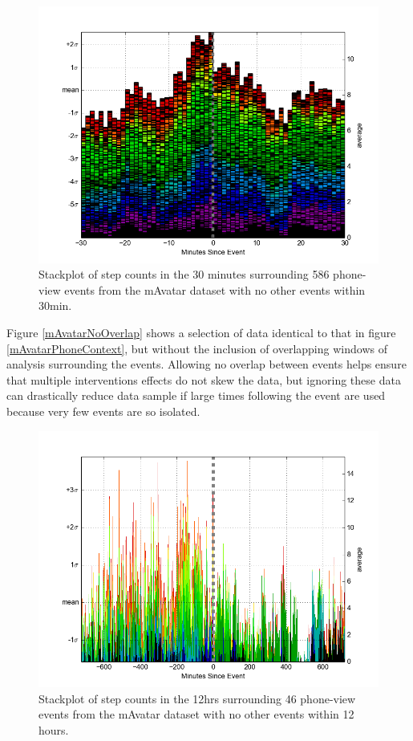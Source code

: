 \begin{figure}
\centering
\includegraphics[width=0.9\columnwidth]{./img/mAvatarViews_586_noOverlap.png}
\caption{Stackplot of step counts in the 30 minutes surrounding 586 phone-view events from the mAvatar dataset with no other events within 30min.}
\label{fig:mAvatarNoOverlap}
\end{figure}

Figure \ref{mAvatarNoOverlap} shows a selection of data identical to that in figure \ref{mAvatarPhoneContext}, but without the inclusion of overlapping windows of analysis surrounding the events.
Allowing no overlap between events helps ensure that multiple interventions effects do not skew the data, but ignoring these data can drastically reduce data sample if large times following the event are used because very few events are so isolated.

\begin{figure}
\centering
\includegraphics[width=0.9\columnwidth]{./img/mAvatarViews_46_12hr_noOverlap.png}
\caption{Stackplot of step counts in the 12hrs surrounding 46 phone-view events from the mAvatar dataset with no other events within 12 hours.}
\label{fig:mAvatarNoOverlap12hr}
\end{figure}

